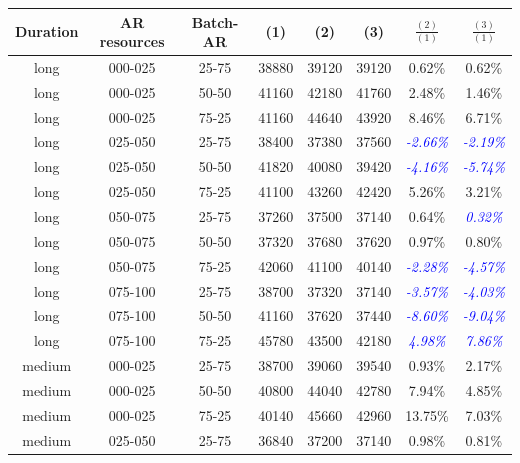 \begin{table}

\begin{center}
\begin{tabular}{|c|c|c|c|c|c|c|c|}
\hline
\textbf{Duration} & \textbf{AR resources} & \textbf{Batch-AR} & \textbf{(1)} & \textbf{(2)} & \textbf{(3)} &  \textbf{$\frac{(2)}{(1)}$} & \textbf{$\frac{(3)}{(1)}$}
\\\hline
long & 000-025 & 25-75 & 38880 & 39120 & 39120 & 0.62\% & 0.62\%
\\\hline
long & 000-025 & 50-50 & 41160 & 42180 & 41760 & 2.48\% & 1.46\%
\\\hline
long & 000-025 & 75-25 & 41160 & 44640 & 43920 & 8.46\% & 6.71\%
\\\hline
long & 025-050 & 25-75 & 38400 & 37380 & 37560 & \textcolor{blue}{\textit{-2.66\%}} & \textcolor{blue}{\textit{-2.19\%}}
\\\hline
long & 025-050 & 50-50 & 41820 & 40080 & 39420 & \textcolor{blue}{\textit{-4.16\%}} & \textcolor{blue}{\textit{-5.74\%}}
\\\hline
long & 025-050 & 75-25 & 41100 & 43260 & 42420 & 5.26\% & 3.21\%
\\\hline
long & 050-075 & 25-75 & 37260 & 37500 & 37140 & 0.64\% & \textcolor{blue}{\textit{0.32\%}}
\\\hline
long & 050-075 & 50-50 & 37320 & 37680 & 37620 & 0.97\% & 0.80\%
\\\hline
long & 050-075 & 75-25 & 42060 & 41100 & 40140 & \textcolor{blue}{\textit{-2.28\%}} & \textcolor{blue}{\textit{-4.57\%}}
\\\hline
long & 075-100 & 25-75 & 38700 & 37320 & 37140 & \textcolor{blue}{\textit{-3.57\%}} & \textcolor{blue}{\textit{-4.03\%}}
\\\hline
long & 075-100 & 50-50 & 41160 & 37620 & 37440 & \textcolor{blue}{\textit{-8.60\%}} & \textcolor{blue}{\textit{-9.04\%}}
\\\hline
long & 075-100 & 75-25 & 45780 & 43500 & 42180 & \textcolor{blue}{\textit{4.98\%}} & \textcolor{blue}{\textit{7.86\%}}
\\\hline
medium & 000-025 & 25-75 & 38700 & 39060 & 39540 & 0.93\% & 2.17\%
\\\hline
medium & 000-025 & 50-50 & 40800 & 44040 & 42780 & 7.94\% & 4.85\%
\\\hline
medium & 000-025 & 75-25 & 40140 & 45660 & 42960 & 13.75\% & 7.03\%
\\\hline
medium & 025-050 & 25-75 & 36840 & 37200 & 37140 & 0.98\% & 0.81\%
\\\hline

\end{tabular}
\end{center}
\end{table}
